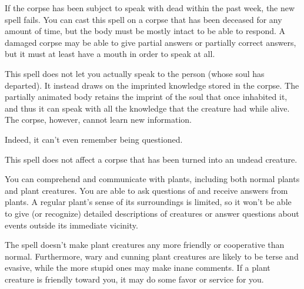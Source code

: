 \begin{multicols}{2}
\begin{small}
\smallskip\noindent If the corpse has been subject to speak with dead within the past week, the new spell fails. You can cast this spell on a corpse that has been deceased for any amount of time, but the body must be mostly intact to be able to respond. A damaged corpse may be able to give partial answers or partially correct answers, but it must at least have a mouth in order to speak at all. 

\smallskip\noindent This spell does not let you actually speak to the person (whose soul has departed). It instead draws on the imprinted knowledge stored in the corpse. The partially animated body retains the imprint of the soul that once inhabited it, and thus it can speak with all the knowledge that the creature had while alive. The corpse, however, cannot learn new information.

\smallskip\noindent Indeed, it can't even remember being questioned.

\smallskip\noindent This spell does not affect a corpse that has been turned into an undead creature.

\noindent You can comprehend and communicate with plants, including both normal plants and plant creatures. You are able to ask questions of and receive answers from plants. A regular plant's sense of its surroundings is limited, so it won't be able to give (or recognize) detailed descriptions of creatures or answer questions about events outside its immediate vicinity.

\smallskip\noindent The spell doesn't make plant creatures any more friendly or cooperative than normal. Furthermore, wary and cunning plant creatures are likely to be terse and evasive, while the more stupid ones may make inane comments. If a plant creature is friendly toward you, it may do some favor or service for you.


\end{small}
\end{multicols}
